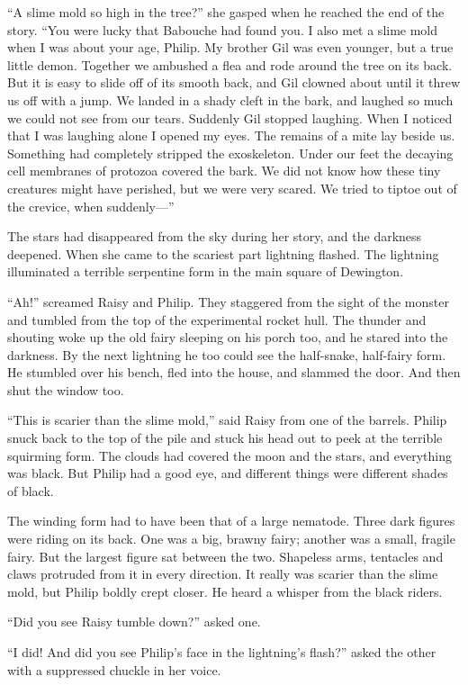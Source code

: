 \documentclass[10pt, draft]{memoir}
\begin{document}
``A slime mold so high in the tree?'' she gasped when he reached the end of the
story. ``You were lucky that Babouche had found you. I also met a slime mold
when I was about your age, Philip. My brother Gil was even younger, but a true
little demon. Together we ambushed a flea and rode around the tree on its back.
But it is easy to slide off of its smooth back, and Gil clowned about until it
threw us off with a jump. We landed in a shady cleft in the bark, and laughed
so much we could not see from our tears. Suddenly Gil stopped laughing. When I
noticed that I was laughing alone I opened my eyes. The remains of a mite lay
beside us. Something had completely stripped the exoskeleton. Under our feet
the decaying cell membranes of protozoa covered the bark. We did not know how
these tiny creatures might have perished, but we were very scared. We tried to
tiptoe out of the crevice, when suddenly---''

The stars had disappeared from the sky during her story, and the darkness
deepened. When she came to the scariest part lightning flashed. The lightning
illuminated a terrible serpentine form in the main square of Dewington.

``Ah!'' screamed Raisy and Philip. They staggered from the sight of the monster
and tumbled from the top of the experimental rocket hull. The thunder and
shouting woke up the old fairy sleeping on his porch too, and he stared into
the darkness. By the next lightning he too could see the half-snake, half-fairy
form. He stumbled over his bench, fled into the house, and slammed the door.
And then shut the window too.

``This is scarier than the slime mold,'' said Raisy from one of the barrels.
Philip snuck back to the top of the pile and stuck his head out to peek at the
terrible squirming form. The clouds had covered the moon and the stars, and
everything was black. But Philip had a good eye, and different things were
different shades of black.

The winding form had to have been that of a large nematode. Three dark figures
were riding on its back. One was a big, brawny fairy; another was a small,
fragile fairy. But the largest figure sat between the two. Shapeless arms,
tentacles and claws protruded from it in every direction. It really was scarier
than the slime mold, but Philip boldly crept closer. He heard a whisper from
the black riders.

``Did you see Raisy tumble down?'' asked one.

``I did! And did you see Philip's face in the lightning's flash?'' asked the
other with a suppressed chuckle in her voice.
\end{document}
